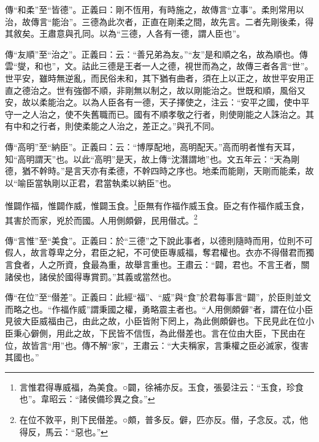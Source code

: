 {\noindent\zhuan{}\fzbyks 傳“和柔”至“皆德”。正義曰：剛不恆用，有時施之，故傳言“立事”。柔則常用以治，故傳言“能治”。三德為此次者，正直在剛柔之間，故先言。二者先剛後柔，得其敘矣。王肅意與孔同。以為“三德，人各有一德，謂人臣也”。 \par}

{\noindent\zhuan{}\fzbyks 傳“友順”至“治之”。正義曰：云：“善兄弟為友。”“友”是和順之名，故為順也。傳雲“燮，和也”，文。詁此三德是王者一人之德，視世而為之，故傳三者各言“世”。世平安，雖時無逆亂，而民俗未和，其下猶有曲者，須在上以正之，故世平安用正直之德治之。世有強御不順，非剛無以制之，故以剛能治之。世既和順，風俗又安，故以柔能治之。以為人臣各有一德，天子擇使之，注云：“安平之國，使中平守一之人治之，使不失舊職而已。國有不順孝敬之行者，則使剛能之人誅治之。其有中和之行者，則使柔能之人治之，差正之。”與孔不同。 \par}

{\noindent\zhuan{}\fzbyks 傳“高明”至“納臣”。正義曰：云：“博厚配地，高明配天。”高而明者惟有天耳，知“高明謂天”也。以此“高明”是天，故上傳“沈潛謂地”也。文五年云：“天為剛德，猶不幹時。”是言天亦有柔德，不幹四時之序也。地柔而能剛，天剛而能柔，故以“喻臣當執剛以正君，君當執柔以納臣”也。 \par}

惟闢作福，惟闢作威，惟闢玉食。\footnote{言惟君得專威福，為美食。○闢，徐補亦反。玉食，張晏注云：“玉食，珍食也”。韋昭云：“諸侯備珍異之食。”}臣無有作福作威玉食。臣之有作福作威玉食，其害於而家，兇於而國。人用側頗僻，民用僣忒。\footnote{在位不敦平，則下民僣差。○頗，普多反。僻，匹亦反。僣，子念反。忒，他得反，馬云：“惡也。”}

{\noindent\zhuan{}\fzbyks 傳“言惟”至“美食”。正義曰：於“三德”之下說此事者，以德則隨時而用，位則不可假人，故言尊卑之分，君臣之紀，不可使臣專威福，奪君權也。衣亦不得僣君而獨言食者，人之所資，食最為重，故舉言重也。王肅云：“闢，君也。不言王者，關諸侯也，諸侯於國得專賞罰。”其義或當然也。 \par}

{\noindent\zhuan{}\fzbyks 傳“在位”至“僣差”。正義曰：此經“福”、“威”與“食”於君每事言“闢”，於臣則並文而略之也。“作福作威”謂秉國之權，勇略震主者也。“人用側頗僻”者，謂在位小臣見彼大臣威福由己，由此之故，小臣皆附下罔上，為此側頗僻也。下民見此在位小臣秉心僻側，用此之故，下民皆不信恆，為此僣差也。言在位由大臣，下民由在位，故皆言“用”也。傳不解“家”，王肅云：“大夫稱家，言秉權之臣必滅家，復害其國也。” \par}

